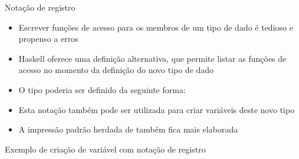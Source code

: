 \begin{frame}[fragile]{Notação de registro}

    \begin{itemize}
        \item Escrever funções de acesso para os membros de um tipo de dado é tedioso e
            propenso a erros

        \item Haskell oferece uma definição alternativa, que permite listar as funções de
            acesso no momento da definição do novo tipo de dado

        \item O tipo  poderia ser definido da seguinte forma:


        \item Esta notação também pode ser utilizada para criar variáveis deste novo tipo

        \item A impressão padrão herdada de  também fica mais elaborada
    \end{itemize}

\end{frame}

\begin{frame}[fragile]{Exemplo de criação de variável com notação de registro}
\end{frame}

